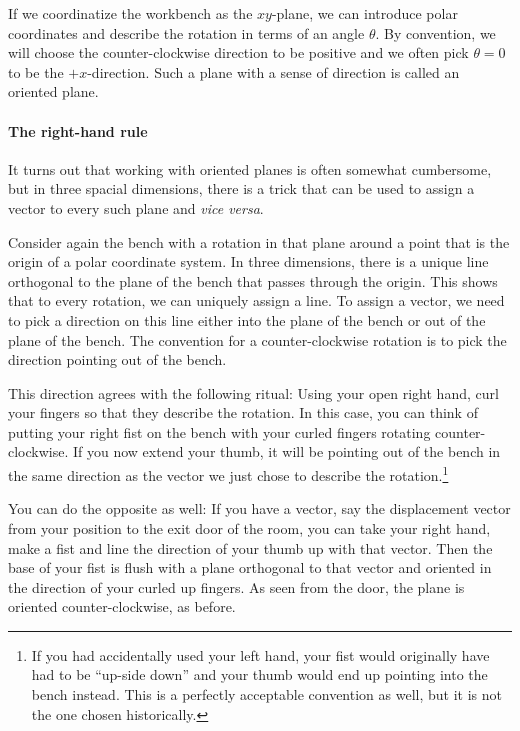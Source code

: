 If we coordinatize the workbench as the $xy$-plane, we can introduce polar coordinates and describe the rotation in terms of an angle $θ$. By convention, we will choose the counter-clockwise direction to be positive and we often pick $θ =0$ to be the $+x$-direction. Such a plane with a sense of direction is called an oriented plane. 

\paragraph{The right-hand rule}
It turns out that working with oriented planes is often somewhat cumbersome, but in three spacial dimensions, there is a trick that can be used to assign a vector to every such plane and {\it vice versa}. 

Consider again the bench with a rotation in that plane around a point that is the origin of a polar coordinate system. In three dimensions, there is a unique line orthogonal to the plane of the bench that passes through the origin. This shows that to every rotation, we can uniquely assign a line. To assign a vector, we need to pick a direction on this line either into the plane of the bench or out of the plane of the bench. The convention for a counter-clockwise rotation is to pick the direction pointing out of the bench. 

This direction agrees with the following ritual: Using your open right hand, curl your fingers so that they describe the rotation. In this case, you can think of putting your right fist on the bench with your curled fingers rotating counter-clockwise. If you now extend your thumb, it will be pointing out of the bench in the same direction as the vector we just chose to describe the rotation.\footnote{If you had accidentally used your left hand, your fist would originally have had to be “up-side down” and your thumb would end up pointing into the bench instead. This is a perfectly acceptable convention as well, but it is not the one chosen historically.}

You can do the opposite as well: If you have a vector, say the displacement vector from your position to the exit door of the room, you can take your right hand, make a fist and line the direction of your thumb up with that vector. Then the base of your fist is flush with a plane orthogonal to that vector and oriented in the direction of your curled up fingers. As seen from the door, the plane is oriented counter-clockwise, as before. 

